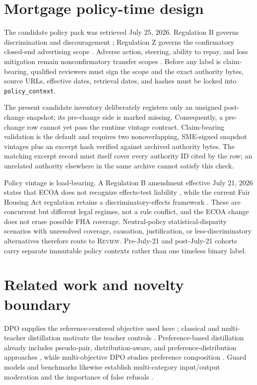 \documentclass[10pt]{article}
\newcommand{\review}{\textsc{Review}}
\begin{document}
\section{Mortgage policy-time design}

The candidate policy pack was retrieved July 25, 2026. Regulation B governs
discrimination and discouragement \cite{regb10024}; Regulation Z governs the
confirmatory closed-end advertising scope \cite{regz102624}. Adverse action,
steering, ability to repay, and loss mitigation remain nonconfirmatory transfer
scopes \cite{regb10029,regz102636,regz102643,regx102441}. Before any label is
claim-bearing, qualified reviewers must sign the scope and the exact authority
bytes, source URLs, effective dates, retrieval dates, and hashes must be locked
into \texttt{policy\_context}.

The present candidate inventory deliberately registers only an unsigned
post-change snapshot; its pre-change side is marked missing. Consequently, a
pre-change row cannot yet pass the runtime vintage contract. Claim-bearing
validation is the default and requires two nonoverlapping, SME-signed snapshot
vintages plus an excerpt hash verified against archived authority bytes. The
matching excerpt record must itself cover every authority ID cited by the row;
an unrelated authority elsewhere in the same archive cannot satisfy this check.

Policy vintage is load-bearing. A Regulation B amendment effective July 21,
2026 states that ECOA does not recognize effects-test liability
\cite{regb2026final}, while the current Fair Housing Act regulation retains a
discriminatory-effects framework \cite{fha100500}. These are concurrent but
different legal regimes, not a rule conflict, and the ECOA change does not erase
possible FHA coverage. Neutral-policy statistical-disparity scenarios with
unresolved coverage, causation, justification, or less-discriminatory
alternatives therefore route to \review. Pre-July-21 and post-July-21 cohorts
carry separate immutable policy contexts rather than one timeless binary label.

\section{Related work and novelty boundary}

DPO supplies the reference-centered objective used here
\cite{rafailov2023dpo}; classical and multi-teacher distillation motivate the
teacher controls \cite{hinton2015distilling,zhang2018dml,zhang2022camt}.
Preference-based distillation already includes pseudo-pair, distribution-aware,
and preference-distribution approaches
\cite{plad2024,dadpo2025,pad2025}, while multi-objective DPO studies preference
composition \cite{modpo2024}. Guard models and benchmarks likewise establish
multi-category input/output moderation and the importance of false refusals
\cite{llamaguard2023,wildguard2024,guardbench2024}.
\end{document}

